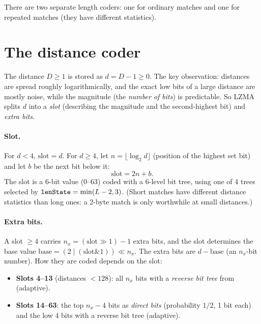 \documentclass[11pt,a4paper,oneside]{book}
\newcommand{\code}[1]{\texttt{\detokenize{#1}}}
\begin{document}
There are two separate length coders: one for ordinary matches and one for repeated matches (they have different statistics).

\section{The distance coder}

The distance $D\ge1$ is stored as $d=D-1\ge0$. The key observation: distances are spread roughly logarithmically, and the exact low bits of a large distance
are mostly noise, while the magnitude (the \emph{number of bits}) is predictable. So LZMA splits $d$ into a \emph{slot} (describing the magnitude and the
second-highest bit) and \emph{extra bits}.

\paragraph{Slot.} For $d<4$, $\text{slot}=d$. For $d\ge4$, let $n=\lfloor\log_2 d\rfloor$ (position of the highest set bit) and let $b$ be the next bit below it:
\[
\text{slot}=2n+b.
\]
The slot is a 6-bit value (0--63) coded with a 6-level bit tree, using one of 4 trees selected by $\code{lenState}=\min(L-2,3)$. (Short matches have different distance
statistics than long ones: a 2-byte match is only worthwhile at small distances.)

\paragraph{Extra bits.} A slot $\ge4$ carries $n_x=(\text{slot}\gg1)-1$ extra bits, and the slot determines the base value
$\text{base}=(2\mid(\text{slot}\mathbin{\&}1))\ll n_x$. The extra bits are $d-\text{base}$ (an $n_x$-bit number). How they are coded depends on the slot:
\begin{itemize}
\item \textbf{Slots 4--13} (distances $<128$): all $n_x$ bits with a \emph{reverse bit tree} from \code{posSpecial} (adaptive).
\item \textbf{Slots 14--63}: the top $n_x-4$ bits as \emph{direct bits} (probability $1/2$, 1 bit each) and the low 4 bits with a reverse bit tree \code{align} (adaptive).
\end{itemize}
\end{document}
